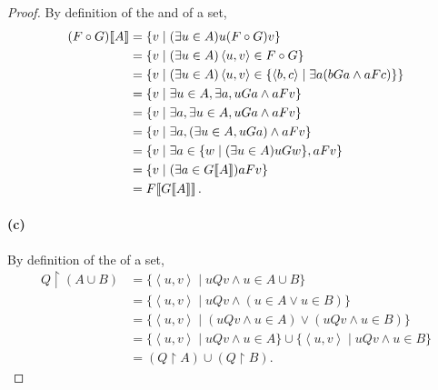 \documentclass{report}
\begin{document}
\begin{proof}
    By definition of the  and  of a
      set,
      \begin{align*}
        (F \circ G)\!\left\llbracket A\right\rrbracket
          & = \{v \mid (\exists u \in A) u(F \circ G)v\} \\
          & = \{v \mid (\exists u \in A) \left< u, v \right> \in F \circ G\} \\
          & = \{v \mid (\exists u \in A)
            \left< u, v \right> \in \{\left< b, c \right> \mid
              \exists a(bGa \land aFc)\}\} \\
          & = \{v \mid \exists u \in A, \exists a, uGa \land aFv\} \\
          & = \{v \mid \exists a, \exists u \in A, uGa \land aFv\} \\
          & = \{v \mid \exists a, (\exists u \in A, uGa) \land aFv\} \\
          & = \{v \mid \exists a \in \{w \mid (\exists u \in A)uGw\}, aFv\} \\
          & = \{v \mid (\exists a \in G\!\left\llbracket A\right\rrbracket) aFv\} \\
          & = F\!\left\llbracket G\!\left\llbracket A\right\rrbracket\right\rrbracket.
      \end{align*}

  \paragraph{(c)}%

    By definition of the  of a set,
      \begin{align*}
        Q \restriction (A \cup B)
          & = \{\left< u, v \right> \mid uQv \land u \in A \cup B\} \\
          & = \{\left< u, v \right> \mid uQv \land (u \in A \lor u \in B)\} \\
          & = \{\left< u, v \right> \mid
            (uQv \land u \in A) \lor (uQv \land u \in B)\} \\
          & = \{\left< u, v \right> \mid uQv \land u \in A\} \cup
            \{\left< u, v \right> \mid uQv \land u \in B\} \\
          & = (Q \restriction A) \cup (Q \restriction B).
      \end{align*}

\end{proof}

\subsection{}%
\label{sub:exercise-3.23}
\end{document}
